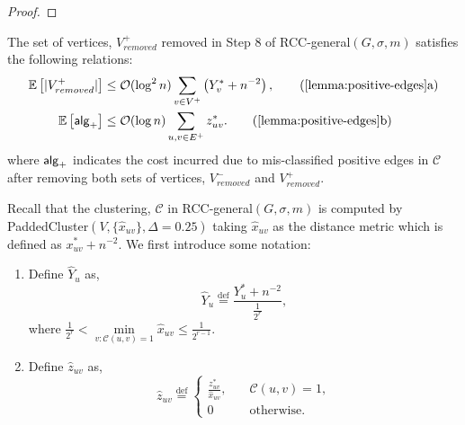 \begin{proof}
\end{proof}

\begin{lemma} \label{lemma:positive-edges}
The set of vertices, $V^+_{removed}$ removed in Step 8 of {\sf RCC-general}$(G,\sigma,m)$ satisfies the following relations:
\begin{align}
    \mathbb{E} \left[ |V^+_{removed}| \right] &\le \mathcal{O} (\log^2 n) \sum_{v \in V^+} \left( Y_v^* + n^{-2} \right), \label{eq:e06} \tag{\ref{lemma:positive-edges}a}\\
    \mathbb{E} \left[\alg_+ \right] &\le \mathcal{O} (\log n) \sum_{u,v \in E^+} z^*_{uv}. \label{eq:e07} \tag{\ref{lemma:positive-edges}b}
\end{align}
where $\mathsf{alg}_+$ indicates the cost incurred due to mis-classified positive edges in $\mathcal{C}$ after removing both sets of vertices, $V_{removed}^-$ and $V_{removed}^+$.
\end{lemma}
Recall that the clustering, $\mathcal{C}$ in {\sf RCC-general}$(G,\sigma,m)$ is computed by {\sf PaddedCluster}$(V,\{ \hat{x}_{uv} \},\Delta=0.25)$ taking $\hat{x}_{uv}$ as the distance metric which is defined as $x_{uv}^* + n^{-2}$. We first introduce some notation:
\begin{enumerate}
    \item Define $\hat{Y}_u$ as,
	\begin{equation*}
	    \hat{Y}_{u} \overset{\mathrm{def}}{=} \frac{Y_u^* + n^{-2}}{\frac{1}{2^r}},
	\end{equation*}
	where $\frac{1}{2^{r}} < \underset{v : \mathcal{C} (u,v) = 1}{\min} \hat{x}_{uv} \le \frac{1}{2^{r-1}}$.
	\item Define $\hat{z}_{uv}$ as,
	\begin{equation}
	    \hat{z}_{uv} \overset{\mathrm{def}}{=} 
	    \begin{cases}
	    \frac{z_{uv}^*}{\hat{x}_{uv}}, \quad & \mathcal{C} (u,v) = 1,\\
	    0 &\text{otherwise}.
	    \end{cases}
	    \label{eq:001213}
	\end{equation}
\end{enumerate}

